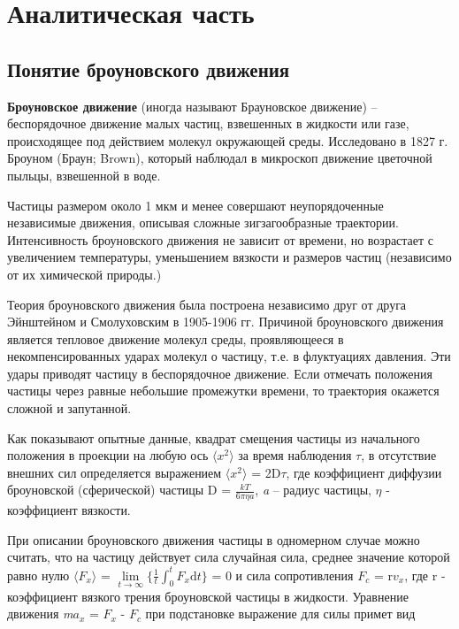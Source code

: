 \chapter{Аналитическая часть}

\section{Понятие броуновского движения}

\textbf{Броуновское движение} (иногда называют Брауновское движение) -- беспорядочное движение малых частиц, взвешенных в жидкости или газе, происходящее под действием молекул окружающей среды. Исследовано в 1827 г. Броуном (Браун; Brown), который наблюдал в микроскоп движение цветочной пыльцы, взвешенной в воде. 


Частицы размером около 1 мкм и менее совершают неупорядоченные независимые движения, описывая сложные зигзагообразные траектории. Интенсивность броуновского движения не зависит от времени, но возрастает с увеличением температуры, уменьшением вязкости и размеров частиц (независимо от их химической природы.)

Теория броуновского движения была построена независимо друг от друга Эйнштейном и Смолуховским в 1905-1906 гг. Причиной броуновского движения является тепловое движение молекул среды, проявляющееся в некомпенсированных ударах молекул о частицу, т.е. в флуктуациях давления. Эти удары приводят частицу в беспорядочное движение. Если отмечать положения частицы через равные небольшие промежутки времени, то траектория окажется сложной и запутанной.

Как показывают опытные данные, квадрат смещения частицы из начального положения в проекции на любую ось $ \langle x^2 \rangle $ за время наблюдения $\tau$, в отсутствие внешних сил определяется выражением $  \langle x^2 \rangle $ = 2D$\tau$, где коэффициент диффузии броуновской (сферической) частицы D = $\frac{\textit{k}T}{6\pi\eta\textit{a}}$, \textit{a} – радиус частицы, $\eta$ - коэффициент вязкости.

При описании броуновского движения частицы в одномерном случае можно считать, что на частицу действует сила случайная сила, среднее значение которой равно нулю $  \langle F_x \rangle $ = $\lim\limits_{t \to \infty} \{\frac{1}{t}\int_{0}^{t}F_x\mathrm{d}t\}$ = 0 и сила сопротивления $F_c$ = r$v_x$, где r - коэффициент вязкого трения броуновской частицы в жидкости.  Уравнение движения  \textit{m$a_x$} = $F_x$ - $F_c$ при подстановке выражение для силы примет вид

